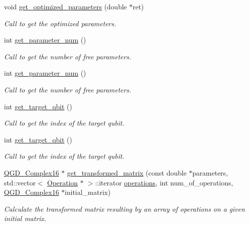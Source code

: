 \begin{DoxyCompactItemize}
void \hyperlink{class_decomposition___base_ae9d74e7137a05ceda5d6efeba8cc6c8e}{get\+\_\+optimized\+\_\+parameters} (double $\ast$ret)
\begin{DoxyCompactList}\small\item\em Call to get the optimized parameters. \end{DoxyCompactList}\item 
int \hyperlink{class_operation__block_af7ff4a8876a7b1c062ea2f35efac18b0}{get\+\_\+parameter\+\_\+num} ()
\begin{DoxyCompactList}\small\item\em Call to get the number of free parameters. \end{DoxyCompactList}\item 
int \hyperlink{class_operation__block_af7ff4a8876a7b1c062ea2f35efac18b0}{get\+\_\+parameter\+\_\+num} ()
\begin{DoxyCompactList}\small\item\em Call to get the number of free parameters. \end{DoxyCompactList}\item 
int \hyperlink{class_operation_a55eee2ad4b90be085b1ec2ce018502f8}{get\+\_\+target\+\_\+qbit} ()
\begin{DoxyCompactList}\small\item\em Call to get the index of the target qubit. \end{DoxyCompactList}\item 
int \hyperlink{class_operation_a55eee2ad4b90be085b1ec2ce018502f8}{get\+\_\+target\+\_\+qbit} ()
\begin{DoxyCompactList}\small\item\em Call to get the index of the target qubit. \end{DoxyCompactList}\item 
\hyperlink{struct_q_g_d___complex16}{Q\+G\+D\+\_\+\+Complex16} $\ast$ \hyperlink{class_decomposition___base_a8e26f5a31475e4d5a2e9c785a2a57dd9}{get\+\_\+transformed\+\_\+matrix} (const double $\ast$parameters, std\+::vector$<$ \hyperlink{class_operation}{Operation} $\ast$ $>$\+::iterator \hyperlink{class_operation__block_a1efec4139888e591b59acd7b84497af1}{operations}, int num\+\_\+of\+\_\+operations, \hyperlink{struct_q_g_d___complex16}{Q\+G\+D\+\_\+\+Complex16} $\ast$initial\+\_\+matrix)
\begin{DoxyCompactList}\small\item\em Calculate the transformed matrix resulting by an array of operations on a given initial matrix. \end{DoxyCompactList}\item 

\end{DoxyCompactItemize}
